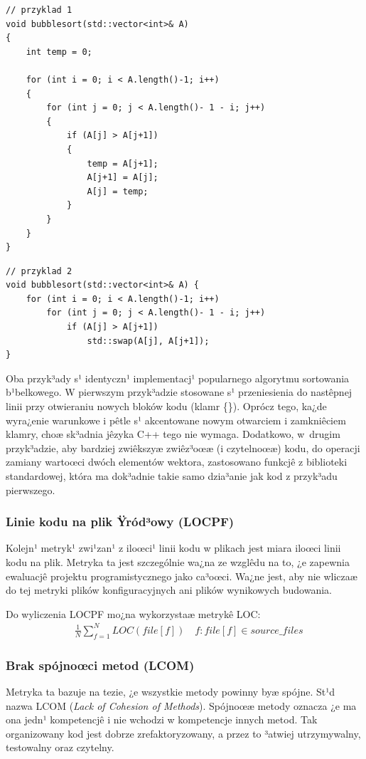 \begin{lstlisting}
// przyklad 1
void bubblesort(std::vector<int>& A)
{
	int temp = 0;

	for (int i = 0; i < A.length()-1; i++)
	{
		for (int j = 0; j < A.length()- 1 - i; j++)
		{
			if (A[j] > A[j+1])
			{
				temp = A[j+1];
				A[j+1] = A[j];
				A[j] = temp;
			}
		}
	}
}
\end{lstlisting}

\begin{lstlisting}
// przyklad 2
void bubblesort(std::vector<int>& A) {
	for (int i = 0; i < A.length()-1; i++)
		for (int j = 0; j < A.length()- 1 - i; j++)
			if (A[j] > A[j+1])
				std::swap(A[j], A[j+1]);
}
\end{lstlisting}

Oba przyk³ady s¹ identyczn¹ implementacj¹ popularnego algorytmu sortowania b¹belkowego. W pierwszym
przyk³adzie stosowane s¹ przeniesienia do nastêpnej linii przy otwieraniu nowych bloków kodu (klamr
\{\}). Oprócz tego, ka¿de wyra¿enie warunkowe i pêtle s¹ akcentowane nowym otwarciem i zamkniêciem
klamry, choæ sk³adnia jêzyka C++ tego nie wymaga. Dodatkowo, w~drugim przyk³adzie, aby bardziej
zwiêkszyæ zwiêz³oœæ (i czytelnoœæ) kodu, do operacji zamiany wartoœci dwóch elementów wektora,
zastosowano funkcjê z biblioteki standardowej, która ma dok³adnie takie samo dzia³anie jak kod
z przyk³adu pierwszego.

\subsubsection[Linie kodu na plik Ÿród³owy (LOCPF)][Linie kodu na plik Ÿród³owy (LOCPF)]
{Linie kodu na plik Ÿród³owy (LOCPF)}
\label{subsubsec:linieKoduNaPlik}

Kolejn¹ metryk¹ zwi¹zan¹ z iloœci¹ linii kodu w plikach jest miara iloœci linii kodu na plik.
Metryka ta jest szczególnie wa¿na ze wzglêdu na to, ¿e zapewnia ewaluacjê projektu programistycznego
jako ca³oœci. Wa¿ne jest, aby nie wliczaæ do tej metryki plików konfiguracyjnych ani plików
wynikowych budowania.

Do wyliczenia LOCPF mo¿na wykorzystaæ metrykê LOC:
\begin{align*}
    &\frac{1}{N}\sum_{f=1}^NLOC(file[f]) \quad f: file[f] \in source\_files
\end{align*}


\subsubsection[Brak spójnoœci metod (LCOM)][Brak spójnoœci metod (LCOM)]
{Brak spójnoœci metod (LCOM)}
Metryka ta bazuje na tezie, ¿e wszystkie metody powinny byæ spójne. St¹d nazwa LCOM (\textit{Lack of 
Cohesion of Methods}). Spójnoœæ metody oznacza ¿e ma ona jedn¹ kompetencjê i nie wchodzi w
kompetencje innych metod. Tak organizowany kod jest dobrze zrefaktoryzowany, a przez to ³atwiej
utrzymywalny, testowalny oraz czytelny.

